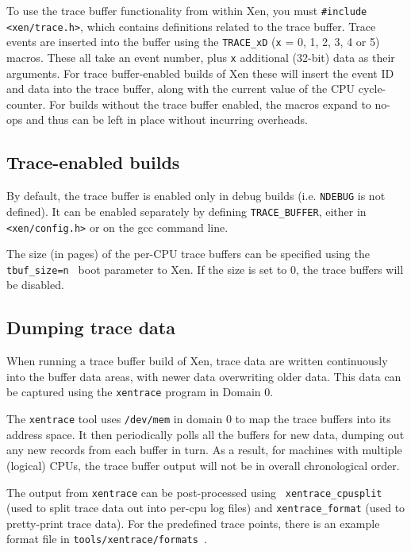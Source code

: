 \documentclass[11pt,twoside,final,openright]{xenstyle}
\begin{document}
To use the trace buffer functionality from within Xen, you must {\tt \#include
<xen/trace.h>}, which contains definitions related to the trace buffer.  Trace
events are inserted into the buffer using the {\tt TRACE\_xD} ({\tt x} = 0, 1,
2, 3, 4 or 5) macros.  These all take an event number, plus {\tt x} additional
(32-bit) data as their arguments.  For trace buffer-enabled builds of Xen these
will insert the event ID and data into the trace buffer, along with the current
value of the CPU cycle-counter.  For builds without the trace buffer enabled,
the macros expand to no-ops and thus can be left in place without incurring
overheads.

\subsection{Trace-enabled builds}

By default, the trace buffer is enabled only in debug builds (i.e. {\tt NDEBUG}
is not defined).  It can be enabled separately by defining {\tt TRACE\_BUFFER},
either in {\tt <xen/config.h>} or on the gcc command line.

The size (in pages) of the per-CPU trace buffers can be specified using the
{\tt tbuf\_size=n } boot parameter to Xen.  If the size is set to 0, the trace
buffers will be disabled.

\subsection{Dumping trace data}

When running a trace buffer build of Xen, trace data are written continuously
into the buffer data areas, with newer data overwriting older data.  This data
can be captured using the {\tt xentrace} program in Domain 0.

The {\tt xentrace} tool uses {\tt /dev/mem} in domain 0 to map the trace
buffers into its address space.  It then periodically polls all the buffers for
new data, dumping out any new records from each buffer in turn.  As a result,
for machines with multiple (logical) CPUs, the trace buffer output will not be
in overall chronological order.

The output from {\tt xentrace} can be post-processed using {\tt
xentrace\_cpusplit} (used to split trace data out into per-cpu log files) and
{\tt xentrace\_format} (used to pretty-print trace data).  For the predefined
trace points, there is an example format file in {\tt tools/xentrace/formats }.
\end{document}
